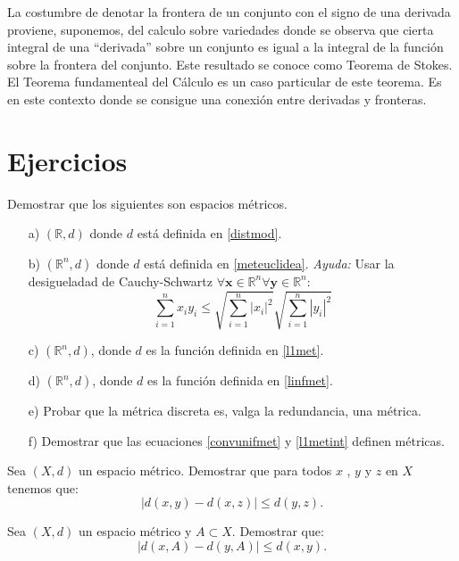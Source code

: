 La costumbre de denotar la frontera de un conjunto con el signo de
una derivada proviene, suponemos, del calculo sobre variedades
donde se observa que cierta integral de una ``derivada'' sobre un
conjunto es igual a la integral de la funci\'on sobre la frontera
del conjunto. Este resultado se conoce como Teorema de Stokes. El
Teorema fundamenteal del C\'alculo es un caso particular de este
teorema. Es en este contexto donde se consigue una conexi\'on
entre derivadas y fronteras.






\section{Ejercicios}

\begin{ejercicio}\label{ejmeteuclidea} Demostrar que los siguientes son espacios m\'etricos.

\begin{itemize}
	\item[a)] $(\mathbb{R},d)$ donde $d$ est\'a definida en
	\vref{distmod}.
	\item[b)]  $(\mathbb{R}^n, d)$ donde $d$ est\'a definida en \vref{meteuclidea}.
	\emph{Ayuda:} Usar
la desigueladad de Cauchy-Schwartz
$\forall\mathbf{x}\in\mathbb{R}^n\forall\mathbf{y}\in\mathbb{R}^n$:
\[
	\sum\limits_{i=1}^{n}x_iy_i\leq
	\sqrt{\sum\limits_{i=1}^{n}|x_i|^2}
	\sqrt{\sum\limits_{i=1}^{n}|y_i|^2}
\]
\item[c)] $(\mathbb{R}^n, d)$, donde $d$ es la funci\'on definida
en \vref{l1met}.

\item[d)]$(\mathbb{R}^n, d)$, donde $d$ es la funci\'on definida
en \vref{linfmet}.
\item[e)] Probar que la m\'etrica discreta es, valga la
redundancia, una m\'etrica.
\item[f)] Demostrar que las ecuaciones \vref{convunifmet} y
\vref{l1metint} definen m\'etricas.
\end{itemize}
\end{ejercicio}

\begin{ejercicio}\label{deslipschitz} Sea $(X,d)$ un espacio m\'etrico. Demostrar que
para todos $x$ , $y$ y $z$ en $X$ tenemos que:
\[|d(x,y)-d(x,z)|\leq d(y,z).\]
\end{ejercicio}

\begin{ejercicio}\label{daconjeslipschitz} Sea $(X,d)$ un espacio
m\'etrico y $A\subset X$. Demostrar que:
\[|d(x,A)-d(y,A)|\leq d(x,y).\]
\end{ejercicio}

